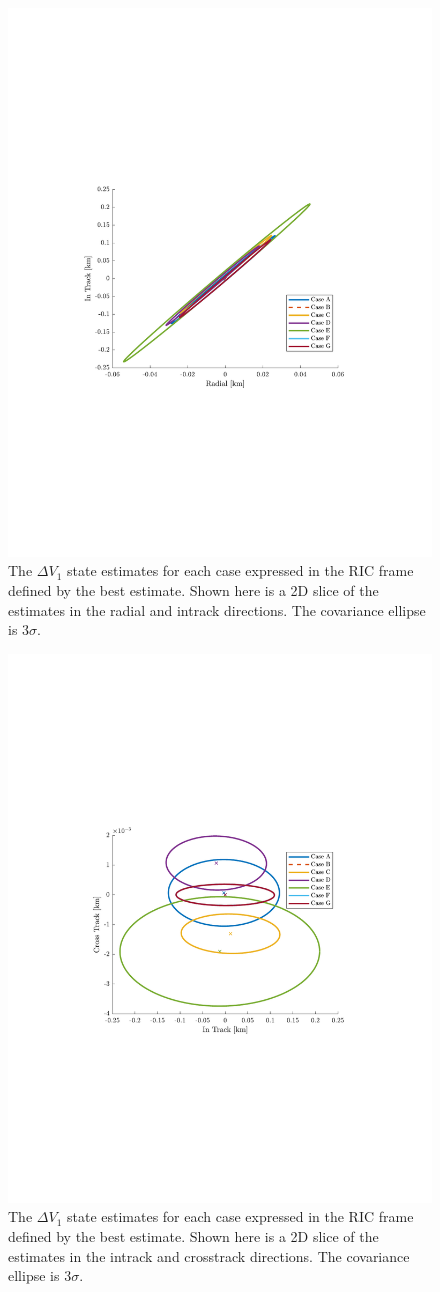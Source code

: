 \documentclass[11pt]{article}
\begin{document}
\begin{figure}[!htb]
	\centering
	\includegraphics[clip,trim=4cm 8.5cm 4cm 8.5cm, width=.5\textwidth]{figs/RI_final.pdf}
	\caption{The $\Delta V_1$ state estimates for each case expressed in the RIC frame defined by the best estimate. Shown here is a 2D slice of the estimates in the radial and intrack directions. The covariance ellipse is $3\sigma$.}
	\label{fig:rad_in}
\end{figure}

\begin{figure}[!htb]
	\centering
	\includegraphics[clip,trim=4cm 8.5cm 4cm 8.5cm, width=.5\textwidth]{figs/CI_final.pdf}
	\caption{The $\Delta V_1$ state estimates for each case expressed in the RIC frame defined by the best estimate. Shown here is a 2D slice of the estimates in the intrack and crosstrack directions. The covariance ellipse is $3\sigma$.}
	\label{fig:cross_in}
\end{figure}
\end{document}
